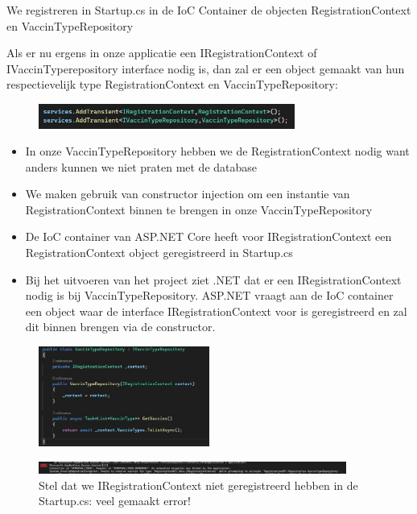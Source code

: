 \documentclass{article}
\begin{document}
We registreren in Startup.cs in de IoC Container de objecten RegistrationContext en VaccinTypeRepository

Als er nu ergens in onze applicatie een IRegistrationContext of IVaccinTyperepository interface nodig is, 
dan zal er een object gemaakt van hun respectievelijk type RegistrationContext en VaccinTypeRepository:

\begin{figure}[H]
    \centering
    \includegraphics[width=0.75\textwidth]{dependency-injection-1.png}
    \caption{}
\end{figure}

\begin{itemize}
    \item In onze VaccinTypeRepository hebben we de RegistrationContext nodig want anders kunnen we niet praten met de database
    \item We maken gebruik van constructor injection om een instantie van RegistrationContext binnen te brengen in onze VaccinTypeRepository
    \item De IoC container van ASP.NET Core heeft voor IRegistrationContext een RegistrationContext object geregistreerd in Startup.cs
    \item Bij het uitvoeren van het project ziet .NET dat er een IRegistrationContext nodig is bij VaccinTypeRepository. ASP.NET vraagt aan de IoC container een object waar de interface IRegistrationContext voor is geregistreerd en zal dit binnen brengen via de constructor.
\end{itemize}

\begin{figure}[H]
    \centering
    \includegraphics[width=0.5\textwidth]{dependency-injection-2.png}
    \caption{}
\end{figure}

\begin{figure}[H]
    \centering
    \includegraphics[width=0.9\textwidth]{dependency-injection-3.png}
    \caption{Stel dat we IRegistrationContext niet geregistreerd hebben in de Startup.cs: veel gemaakt error!}
\end{figure}
\end{document}
